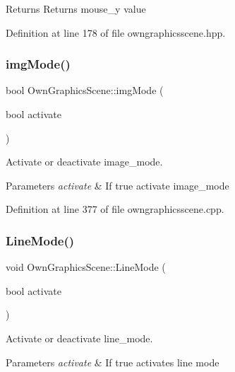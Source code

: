 \begin{DoxyReturn}{Returns}
Returns mouse\+\_\+y value 
\end{DoxyReturn}


Definition at line 178 of file owngraphicsscene.\+hpp.

\mbox{\label{classOwnGraphicsScene_acc6e7978a3f10889e439ceabd155a341}} 
\subsubsection{\texorpdfstring{img\+Mode()}{imgMode()}}
{\footnotesize\ttfamily bool Own\+Graphics\+Scene\+::img\+Mode (\begin{DoxyParamCaption}\item[{bool}]{activate }\end{DoxyParamCaption})}



Activate or deactivate image\+\_\+mode. 


\begin{DoxyParams}{Parameters}
{\em activate} & If true activate image\+\_\+mode \\
\hline
\end{DoxyParams}


Definition at line 377 of file owngraphicsscene.\+cpp.

\mbox{\label{classOwnGraphicsScene_a6b7e69131827f0ae64626af378ff9974}} 
\subsubsection{\texorpdfstring{Line\+Mode()}{LineMode()}}
{\footnotesize\ttfamily void Own\+Graphics\+Scene\+::\+Line\+Mode (\begin{DoxyParamCaption}\item[{bool}]{activate }\end{DoxyParamCaption})}



Activate or deactivate line\+\_\+mode. 


\begin{DoxyParams}{Parameters}
{\em activate} & If true activates line mode \\
\hline
\end{DoxyParams}


